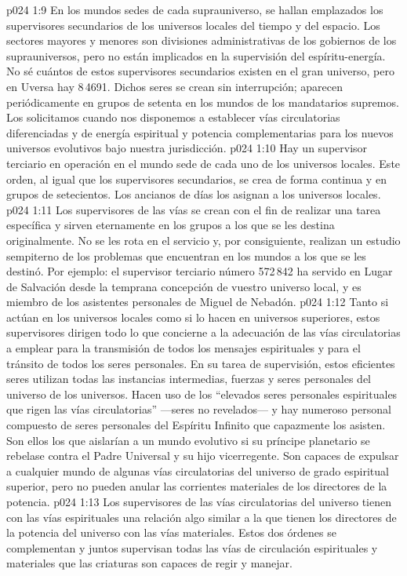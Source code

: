 \vs p024 1:9 En los mundos sedes de cada suprauniverso, se hallan emplazados los supervisores secundarios de los universos locales del tiempo y del espacio. Los sectores mayores y menores son divisiones administrativas de los gobiernos de los suprauniversos, pero no están implicados en la supervisión del espíritu\hyp{}energía. No sé cuántos de estos supervisores secundarios existen en el gran universo, pero en Uversa hay 8\,4691. Dichos seres se crean sin interrupción; aparecen periódicamente en grupos de setenta en los mundos de los mandatarios supremos. Los solicitamos cuando nos disponemos a establecer vías circulatorias diferenciadas y de energía espiritual y potencia complementarias para los nuevos universos evolutivos bajo nuestra jurisdicción.
\vs p024 1:10 Hay un supervisor terciario en operación en el mundo sede de cada uno de los universos locales. Este orden, al igual que los supervisores secundarios, se crea de forma continua y en grupos de setecientos. Los ancianos de días los asignan a los universos locales.
\vs p024 1:11 Los supervisores de las vías se crean con el fin de realizar una tarea específica y sirven eternamente en los grupos a los que se les destina originalmente. No se les rota en el servicio y, por consiguiente, realizan un estudio sempiterno de los problemas que encuentran en los mundos a los que se les destinó. Por ejemplo: el supervisor terciario número 572\,842 ha servido en Lugar de Salvación desde la temprana concepción de vuestro universo local, y es miembro de los asistentes personales de Miguel de Nebadón.
\vs p024 1:12 \pc Tanto si actúan en los universos locales como si lo hacen en universos superiores, estos supervisores dirigen todo lo que concierne a la adecuación de las vías circulatorias a emplear para la transmisión de todos los mensajes espirituales y para el tránsito de todos los seres personales. En su tarea de supervisión, estos eficientes seres utilizan todas las instancias intermedias, fuerzas y seres personales del universo de los universos. Hacen uso de los “elevados seres personales espirituales que rigen las vías circulatorias” ---seres no revelados--- y hay numeroso personal compuesto de seres personales del Espíritu Infinito que capazmente los asisten. Son ellos los que aislarían a un mundo evolutivo si su príncipe planetario se rebelase contra el Padre Universal y su hijo vicerregente. Son capaces de expulsar a cualquier mundo de algunas vías circulatorias del universo de grado espiritual superior, pero no pueden anular las corrientes materiales de los directores de la potencia.
\vs p024 1:13 \pc Los supervisores de las vías circulatorias del universo tienen con las vías espirituales una relación algo similar a la que tienen los directores de la potencia del universo con las vías materiales. Estos dos órdenes se complementan y juntos supervisan todas las vías de circulación espirituales y materiales que las criaturas son capaces de regir y manejar.
